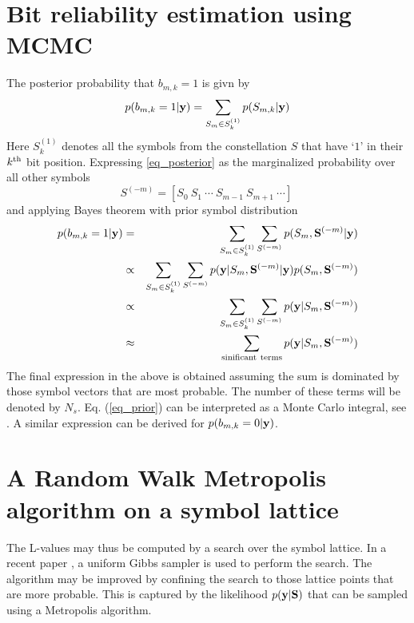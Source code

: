 \documentclass[pre,12pt,aps]{revtex4}
\begin{document}
\section{Bit reliability estimation using MCMC} 
The posterior probability that $b_{m,k}=1$ is givn by
\begin{eqnarray}\label{eq_posterior}
p(b_{m,k}=1\vert {\bf y})=\sum_{S_m\in S_k^{(1)}} p(S_{m,k}\vert {\bf y})
\end{eqnarray}
Here $S_k^{(1)}$ denotes all the symbols from the 
constellation $S$ that have $‘1’$ in their $k^{{\rm th}}$ bit
            position. Expressing \ref{eq_posterior} as the marginalized 
probability over all other symbols
$$S^{(-m)}=[S_0\  S_1\  \cdots\  S_{m-1}\  S_{m+1}\ \cdots]\ $$  
and applying Bayes 
theorem with prior symbol distribution
\begin{eqnarray}\label{eq_prior}
p(b_{m,k}=1\vert {\bf y})&=&
\sum_{S_m \in S_k^{(1)}} \sum_{S^{(-m)}}
                          p(S_m,{\bf S}^{(-m)}\vert {\bf y})
                                   \nonumber\\
&\propto &
\sum_{S_m \in S_k^{(1)}} \sum_{S^{(-m)}}
                          p({\bf y}\vert S_m,{\bf S}^{(-m)}
                            \vert {\bf y})
                          p(S_m,{\bf S}^{(-m)})\nonumber\\
         &\propto &
\sum_{S_m \in S_k^{(1)}} \sum_{S^{(-m)}}
                          p({\bf y}\vert S_m,{\bf S}^{(-m)})\nonumber\\
       &\approx & \sum_{{\rm sinificant\ terms}}
                          p({\bf y}\vert S_m,{\bf S}^{(-m)})
\end{eqnarray}
The final expression in the above is obtained assuming the sum 
is dominated by those symbol vectors that are most probable. 
The number of these terms will be denoted by $N_s$. 
Eq. (\ref{eq_prior}) can  be interpreted as a 
Monte Carlo integral, see \cite{fbzs}. 
A similar expression can be derived for 
$p(b_{m,k}=0\vert {\bf y})$. 


\section{A Random Walk Metropolis algorithm on a symbol lattice} 

The L-values may thus be computed by a search over the symbol lattice. 
In a recent paper \cite{fbzs}, a uniform Gibbs sampler is used 
to perform the search. The algorithm may be improved by 
confining  the search to those lattice points that 
are more probable. This is captured by the likelihood 
$p({\bf y}\vert {\bf S})$ 
that can be sampled using a Metropolis algorithm.
\end{document}
